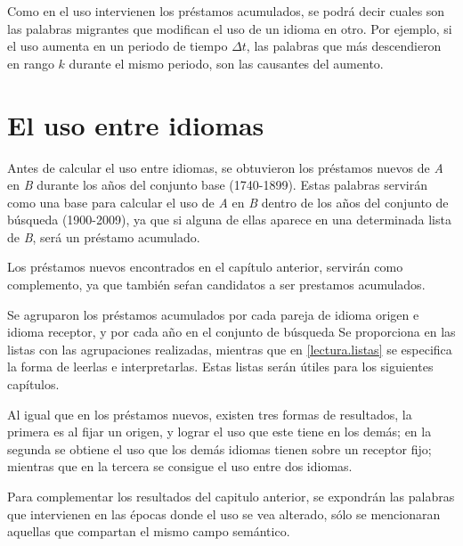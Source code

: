 Como en el uso intervienen los préstamos acumulados, se podrá decir cuales son las palabras migrantes que modifican el uso de un idioma en otro. Por ejemplo, si el uso aumenta en un periodo de tiempo $\Delta t$,  las palabras que más descendieron en rango $k$ durante el mismo periodo,  son las causantes del aumento. 


\section {El uso entre idiomas} 

Antes de calcular el uso entre idiomas, se obtuvieron los préstamos nuevos de \textit{A} en \textit{B} durante los años del conjunto base (1740-1899).
Estas palabras servirán como una base para calcular el uso de \textit{A} en \textit{B} dentro de los años del conjunto de búsqueda (1900-2009), ya que si alguna de ellas aparece en una determinada lista de \textit{B}, será un préstamo acumulado. 

Los préstamos nuevos encontrados en el capítulo anterior, servirán como complemento, ya que también seŕan candidatos a ser prestamos acumulados.

Se agruparon los préstamos acumulados por cada pareja de idioma origen e idioma receptor, y por cada año en el conjunto de búsqueda  Se proporciona en \cite{prestamos_acumulados} las listas con las agrupaciones realizadas, mientras que en \ref{lectura.listas} se especifica la forma de leerlas e interpretarlas. Estas listas serán útiles para los siguientes capítulos. 

Al igual que en los préstamos nuevos, existen tres formas de resultados,  la primera es al fijar un origen,  y lograr el uso que este tiene en los demás; en la segunda se obtiene el uso que los demás idiomas tienen sobre un receptor fijo;  mientras que en la tercera se consigue el uso entre dos idiomas. 


Para complementar los resultados del capitulo anterior, se expondrán las palabras que intervienen en las épocas donde el uso se vea alterado, sólo se mencionaran aquellas que compartan el mismo campo semántico. 

